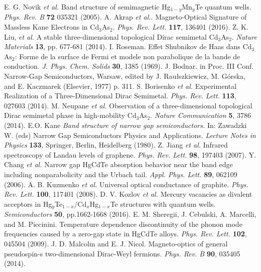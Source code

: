 \documentclass[titlepage,a4paper]{book}
\begin{document}
\begin{thebibliography}{199}
E. G. Novik \textit{et al.} Band structure of semimagnetic Hg$_{1-y}$Mn$_y$Te quantum wells. \textit{Phys. Rev. B} \textbf{72} 035321 (2005).
A. Akrap \textit{et al.}. Magneto-Optical Signature of Massless Kane Electrons in Cd$_3$As$_2$. \textit{Phys. Rev. Lett.} \textbf{117}, 136401 (2016). 
Z. K. Liu, \textit{et al.} A stable three-dimensional topological Dirac semimetal Cd$_3$As$_2$. \textit{Nature Materials} \textbf{13}, pp. 677-681 (2014).  
I. Roseman. Effet Shubnikov de Haas dans Cd$_3$As$_2$: Forme de la surface de Fermi et modele non parabolique de la bande de conduction. \textit{J. Phys. Chem. Solids} \textbf{30}, 1385 (1969).
J. Bodnar. in Proc. III Conf. Narrow-Gap Semiconductors, Warsaw, edited by J. Raułszkiewicz, M. Górska, and E. Kaczmarek (Elsevier, 1977) p. 311.
S. Borisenko \textit{et al.} Experimental Realization of a Three-Dimensional Dirac Semimetal. \textit{Phys. Rev. Lett.} \textbf{113}, 027603 (2014).
M. Neupane \textit{et al.} Observation of a three-dimensional topological Dirac semimetal phase in high-mobility Cd$_3$As$_2$. \textit{Nature Communication} \textbf{5}, 3786 (2014).
E.O. Kane \textit{Band structure of narrow gap semiconductors.} In: Zawadzki W. (eds) Narrow Gap Semiconductors Physics and Applications. \textit{Lecture Notes in Physics} \textbf{133}, Springer, Berlin, Heidelberg (1980).
Z. Jiang \textit{et al.} Infrared spectroscopy of Landau levels of graphene. \textit{Phys. Rev. Lett.} \textbf{98}, 197403 (2007).
Y. Chang \textit{et al.} Narrow gap HgCdTe absorption behavior near the band edge including nonparabolicity and the Urbach tail. \textit{Appl. Phys. Lett.} \textbf{89}, 062109 (2006).
A. B. Kuzmenko \textit{et al.} Universal optical conductance of graphite. \textit{Phys. Rev. Lett.} \textbf{100}, 117401 (2008).
D. V. Kozlov \textit{et al.} Mercury vacancies as divalent acceptors in Hg$_y$Te$_{1-x}$/Cd$_x$Hg$_{1-x}$Te structures with quantum wells. \textit{Semiconductors} \textbf{50}, pp.1662-1668 (2016).
E. M. Sheregii, J. Cebulski, A. Marcelli, and M. Piccinini. Temperature dependence discontinuity of the phonon mode frequencies caused by a zero-gap state in HgCdTe alloys. \textit{Phys. Rev. Lett.} \textbf{102}, 045504 (2009). 
J. D. Malcolm and E. J. Nicol. Magneto-optics of general pseudospin-s two-dimensional Dirac-Weyl fermions. \textit{Phys. Rev. B} \textbf{90}, 035405 (2014).

\end{thebibliography}
\end{document}
